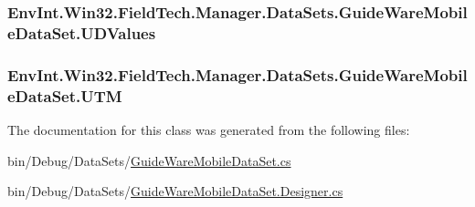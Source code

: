 \subsubsection[{U\+D\+Values}]{ Env\+Int.\+Win32.\+Field\+Tech.\+Manager.\+Data\+Sets.\+Guide\+Ware\+Mobile\+Data\+Set.\+U\+D\+Values\hspace{0.3cm}{\ttfamily [get]}}\label{class_env_int_1_1_win32_1_1_field_tech_1_1_manager_1_1_data_sets_1_1_guide_ware_mobile_data_set_a1fc102b4d5f93e8270dc5d2215b8ff7d}
\hypertarget{class_env_int_1_1_win32_1_1_field_tech_1_1_manager_1_1_data_sets_1_1_guide_ware_mobile_data_set_a6e63afc5641fa72c1be193e87a2583e7}{}
\subsubsection[{U\+T\+M}]{ Env\+Int.\+Win32.\+Field\+Tech.\+Manager.\+Data\+Sets.\+Guide\+Ware\+Mobile\+Data\+Set.\+U\+T\+M\hspace{0.3cm}{\ttfamily [get]}}\label{class_env_int_1_1_win32_1_1_field_tech_1_1_manager_1_1_data_sets_1_1_guide_ware_mobile_data_set_a6e63afc5641fa72c1be193e87a2583e7}


The documentation for this class was generated from the following files\+:\begin{DoxyCompactItemize}
\item 
bin/\+Debug/\+Data\+Sets/\hyperlink{bin_2_debug_2_data_sets_2_guide_ware_mobile_data_set_8cs}{Guide\+Ware\+Mobile\+Data\+Set.\+cs}\item 
bin/\+Debug/\+Data\+Sets/\hyperlink{bin_2_debug_2_data_sets_2_guide_ware_mobile_data_set_8_designer_8cs}{Guide\+Ware\+Mobile\+Data\+Set.\+Designer.\+cs}\end{DoxyCompactItemize}
